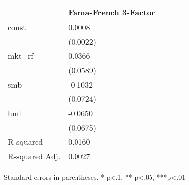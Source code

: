 \begin{table}
\caption{}
\label{}
\begin{center}
\begin{tabular}{ll}
\hline
               & Fama-French 3-Factor  \\
\hline
const          & 0.0008                \\
               & (0.0022)              \\
mkt\_rf        & 0.0366                \\
               & (0.0589)              \\
smb            & -0.1032               \\
               & (0.0724)              \\
hml            & -0.0650               \\
               & (0.0675)              \\
R-squared      & 0.0160                \\
R-squared Adj. & 0.0027                \\
\hline
\end{tabular}
\end{center}
\end{table}
\bigskip
Standard errors in parentheses. \newline 
* p<.1, ** p<.05, ***p<.01